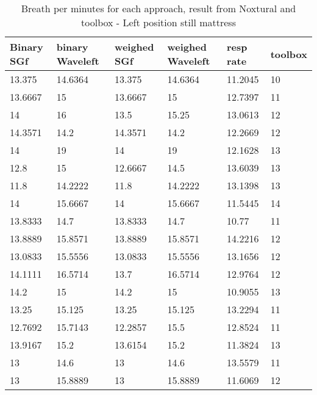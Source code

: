 \begin{table}\begin{tabular}{|llllll|}
\hline 
Binary SGf & binary Waveleft & weighed  SGf & weighed Waveleft & resp rate & toolbox \\ 
\hline 
13.375 & 14.6364 & 13.375 & 14.6364 & 11.2045 & 10 \\ 
13.6667 & 15 & 13.6667 & 15 & 12.7397 & 11 \\ 
14 & 16 & 13.5 & 15.25 & 13.0613 & 12 \\ 
14.3571 & 14.2 & 14.3571 & 14.2 & 12.2669 & 12 \\ 
14 & 19 & 14 & 19 & 12.1628 & 13 \\ 
12.8 & 15 & 12.6667 & 14.5 & 13.6039 & 13 \\ 
11.8 & 14.2222 & 11.8 & 14.2222 & 13.1398 & 13 \\ 
14 & 15.6667 & 14 & 15.6667 & 11.5445 & 14 \\ 
13.8333 & 14.7 & 13.8333 & 14.7 & 10.77 & 11 \\ 
13.8889 & 15.8571 & 13.8889 & 15.8571 & 14.2216 & 12 \\ 
13.0833 & 15.5556 & 13.0833 & 15.5556 & 13.1656 & 12 \\ 
14.1111 & 16.5714 & 13.7 & 16.5714 & 12.9764 & 12 \\ 
14.2 & 15 & 14.2 & 15 & 10.9055 & 13 \\ 
13.25 & 15.125 & 13.25 & 15.125 & 13.2294 & 11 \\ 
12.7692 & 15.7143 & 12.2857 & 15.5 & 12.8524 & 11 \\ 
13.9167 & 15.2 & 13.6154 & 15.2 & 11.3824 & 13 \\ 
13 & 14.6 & 13 & 14.6 & 13.5579 & 11 \\ 
13 & 15.8889 & 13 & 15.8889 & 11.6069 & 12 \\ 
\hline 
\end{tabular}
\caption{Breath per minutes for each approach, result from Noxtural and toolbox
- Left position still mattress}
\end{table}
